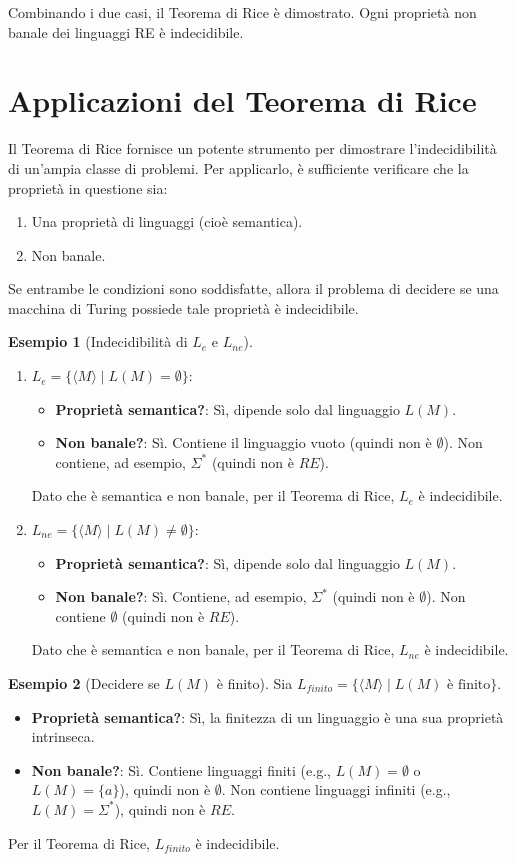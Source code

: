 \documentclass[a4paper]{article}
\theoremstyle{definition} %
\newtheorem{example}{Esempio}
\begin{document}
Combinando i due casi, il Teorema di Rice è dimostrato. Ogni proprietà non banale dei linguaggi RE è indecidibile.

\section{Applicazioni del Teorema di Rice}
Il Teorema di Rice fornisce un potente strumento per dimostrare l'indecidibilità di un'ampia classe di problemi. Per applicarlo, è sufficiente verificare che la proprietà in questione sia:
\begin{enumerate}
    \item Una proprietà di linguaggi (cioè semantica).
    \item Non banale.
\end{enumerate}
Se entrambe le condizioni sono soddisfatte, allora il problema di decidere se una macchina di Turing possiede tale proprietà è indecidibile.

\begin{example}[Indecidibilità di $L_e$ e $L_{ne}$]
\begin{enumerate}
    \item $L_e = \{\langle M \rangle \mid L(M) = \emptyset\}$:
    \begin{itemize}
        \item \textbf{Proprietà semantica?}: Sì, dipende solo dal linguaggio $L(M)$.
        \item \textbf{Non banale?}: Sì. Contiene il linguaggio vuoto (quindi non è $\emptyset$). Non contiene, ad esempio, $\Sigma^*$ (quindi non è $RE$).
    \end{itemize}
    Dato che è semantica e non banale, per il Teorema di Rice, $L_e$ è indecidibile.
    \item $L_{ne} = \{\langle M \rangle \mid L(M) \neq \emptyset\}$:
    \begin{itemize}
        \item \textbf{Proprietà semantica?}: Sì, dipende solo dal linguaggio $L(M)$.
        \item \textbf{Non banale?}: Sì. Contiene, ad esempio, $\Sigma^*$ (quindi non è $\emptyset$). Non contiene $\emptyset$ (quindi non è $RE$).
    \end{itemize}
    Dato che è semantica e non banale, per il Teorema di Rice, $L_{ne}$ è indecidibile.
\end{enumerate}
\end{example}

\begin{example}[Decidere se $L(M)$ è finito]
Sia $L_{finito} = \{\langle M \rangle \mid L(M) \text{ è finito}\}$.
\begin{itemize}
    \item \textbf{Proprietà semantica?}: Sì, la finitezza di un linguaggio è una sua proprietà intrinseca.
    \item \textbf{Non banale?}: Sì. Contiene linguaggi finiti (e.g., $L(M)=\emptyset$ o $L(M)=\{a\}$), quindi non è $\emptyset$. Non contiene linguaggi infiniti (e.g., $L(M)=\Sigma^*$), quindi non è $RE$.
\end{itemize}
Per il Teorema di Rice, $L_{finito}$ è indecidibile.
\end{example}
\end{document}
